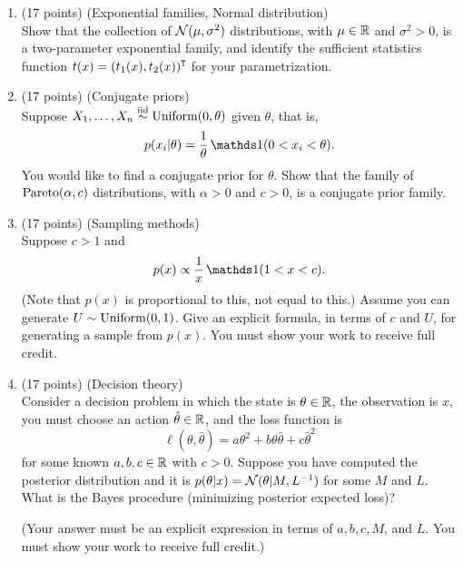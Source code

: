 \documentclass[12pt]{article}
\begin{document}
\begin{enumerate}
\newpage
\item (17 points) (Exponential families, Normal distribution)\\
    Show that the collection of $\mathcal{N}(\mu,\sigma^2)$ distributions, with $\mu\in\mathbb{R}$ and $\sigma^2>0$, is a
    two-parameter exponential family, and identify the sufficient statistics function $t(x)=(t_1(x),t_2(x))^{\mathtt{T}}$ for your parametrization.

\newpage
\item (17 points) (Conjugate priors)\\
    Suppose $X_1,\ldots,X_n\stackrel{\mathrm{iid}}{\sim}\operatorname*{Uniform}(0,\theta)$ given $\theta$, that is,
    $$ p(x_i|\theta) = \frac{1}{\theta}\,\I(0<x_i<\theta). $$
    You would like to find a conjugate prior for $\theta$.
    Show that the family of $\operatorname*{Pareto}(\alpha,c)$ distributions, with $\alpha>0$ and $c>0$, is a conjugate prior family.
    
\newpage
\item (17 points) (Sampling methods)\\
    Suppose $c>1$ and
    $$ p(x) \propto \frac{1}{x}\,\I(1<x<c). $$
    (Note that $p(x)$ is proportional to this, not equal to this.)
    Assume you can generate $U\sim\operatorname*{Uniform}(0,1)$.  Give an explicit formula, in terms of $c$ and $U$, for generating a sample from $p(x)$.  You must show your work to receive full credit.

\newpage
\item (17 points) (Decision theory)\\
    Consider a decision problem in which the state is $\theta\in\mathbb{R}$, the observation is $x$, you must choose an action
    $\hat\theta\in\mathbb{R}$, and the loss function is
    $$\ell(\theta,\hat\theta) = a\theta^2 + b\theta\hat\theta + c\hat\theta^2$$
    for some known $a,b,c\in\mathbb{R}$ with $c>0$.
    Suppose you have computed the posterior distribution and it is $p(\theta|x) = \mathcal{N}(\theta|M,L^{-1})$ for some $M$ and $L$.
    What is the Bayes procedure (minimizing posterior expected loss)?

    \vspace{1em}
    (Your answer must be an explicit expression in terms of $a,b,c,M$, and $L$. You must show your work to receive full credit.)




\end{enumerate}
\end{document}
